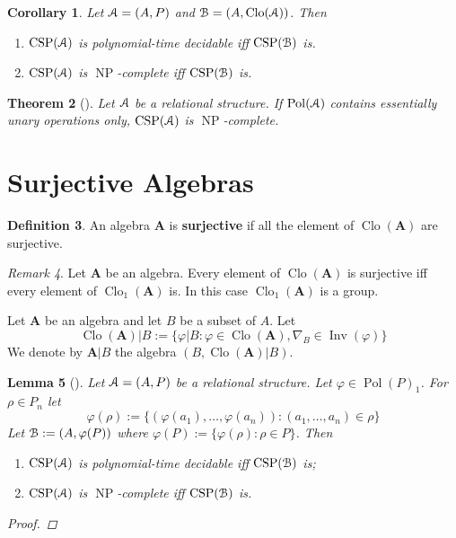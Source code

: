 \documentclass{amsart}
\theoremstyle{plain}
\newtheorem{theorem}{Theorem}[section]
\newtheorem{corollary}[theorem]{Corollary}
\newtheorem{lemma}[theorem]{Lemma}
\theoremstyle{definition}
\newtheorem{definition}[theorem]{Definition}
\theoremstyle{remark}
\newtheorem{remark}[theorem]{Remark}
\def\phi{\varphi}
\DeclareMathOperator{\Clo}{Clo}
\DeclareMathOperator{\CSP}{CSP}
\DeclareMathOperator{\Inv}{Inv}
\DeclareMathOperator{\Pol}{Pol}
\DeclareMathOperator{\NP}{NP}
\begin{document}
\begin{corollary}
    Let $\EuScript{A}=(A,P)$ and $\EuScript{B}=(A, \Clo(\EuScript{A}))$. 
    Then 
    \begin{enumerate}
        \item $\CSP(\EuScript{A})$ is polynomial-time decidable iff $\CSP(\EuScript{B})$ is. 
        \item $\CSP(\EuScript{A})$ is $\NP$-complete iff $\CSP(\EuScript{B})$ is. 
    \end{enumerate}
\end{corollary}

\begin{theorem}[\cite{jeavons}]
    Let $\EuScript{A}$ be a relational structure. 
    If $\Pol(\EuScript{A})$ contains essentially unary operations only, $\CSP(\EuScript{A})$ is $\NP$-complete. 
\end{theorem}

\section{Surjective Algebras}

\begin{definition}
    An algebra $\mathbf{A}$ is \textbf{surjective} if all the element of $\Clo(\mathbf{A})$ are surjective. 
\end{definition}

\begin{remark}
    \label{surj_group}
    Let $\mathbf{A}$ be an algebra. 
    Every element of $\Clo(\mathbf{A})$ is surjective iff every element of $\Clo_1(\mathbf{A})$ is. 
    In this case $\Clo_1(\mathbf{A})$ is a group. 
\end{remark}

Let $\mathbf{A}$ be an algebra and let $B$ be a subset of $A$. 
Let 
\begin{equation*}
    \Clo(\mathbf{A})|B:=\{\phi|B: \phi \in \Clo(\mathbf{A}), \nabla_B \in \Inv(\phi)\}
\end{equation*} 
We denote by $\mathbf{A}|B$ the algebra $(B, \Clo(\mathbf{A})|B)$. 

\begin{lemma}[\cite{jeavons}]
    \label{image}
    Let $\EuScript{A}=(A, P)$ be a relational structure. 
    Let $\phi \in \Pol(P)_1$. 
    For $\rho \in P_n$ let 
    \begin{equation*}
        \phi(\rho):=\{(\phi(a_1), \ldots, \phi(a_n)):(a_1, \ldots, a_n) \in \rho\}
    \end{equation*}
    Let $\EuScript{B}:=(A, \phi(P))$ where $\phi(P):=\{\phi(\rho): \rho \in P\}$.
    Then 
    \begin{enumerate}
        \item $\CSP(\EuScript{A})$ is polynomial-time decidable iff $\CSP(\EuScript{B})$ is; 
        \item $\CSP(\EuScript{A})$ is $\NP$-complete iff $\CSP(\EuScript{B})$ is. 
    \end{enumerate}
    \begin{proof}
        
    \end{proof}
\end{lemma}
\end{document}
